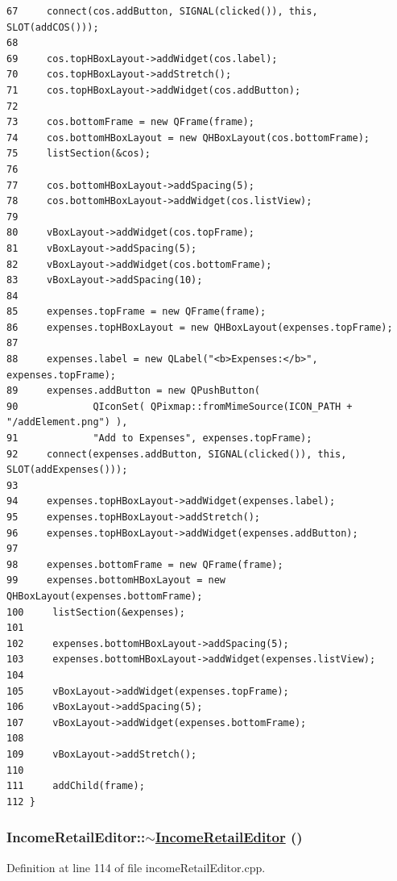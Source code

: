 \begin{verbatim}
67     connect(cos.addButton, SIGNAL(clicked()), this, SLOT(addCOS()));
68     
69     cos.topHBoxLayout->addWidget(cos.label);
70     cos.topHBoxLayout->addStretch();
71     cos.topHBoxLayout->addWidget(cos.addButton);
72     
73     cos.bottomFrame = new QFrame(frame);
74     cos.bottomHBoxLayout = new QHBoxLayout(cos.bottomFrame);
75     listSection(&cos);
76     
77     cos.bottomHBoxLayout->addSpacing(5);
78     cos.bottomHBoxLayout->addWidget(cos.listView);
79     
80     vBoxLayout->addWidget(cos.topFrame);
81     vBoxLayout->addSpacing(5);
82     vBoxLayout->addWidget(cos.bottomFrame);
83     vBoxLayout->addSpacing(10);
84    
85     expenses.topFrame = new QFrame(frame);
86     expenses.topHBoxLayout = new QHBoxLayout(expenses.topFrame);
87     
88     expenses.label = new QLabel("<b>Expenses:</b>", expenses.topFrame);
89     expenses.addButton = new QPushButton(
90             QIconSet( QPixmap::fromMimeSource(ICON_PATH + "/addElement.png") ),
91             "Add to Expenses", expenses.topFrame);
92     connect(expenses.addButton, SIGNAL(clicked()), this, SLOT(addExpenses()));
93     
94     expenses.topHBoxLayout->addWidget(expenses.label);
95     expenses.topHBoxLayout->addStretch();
96     expenses.topHBoxLayout->addWidget(expenses.addButton);
97     
98     expenses.bottomFrame = new QFrame(frame);
99     expenses.bottomHBoxLayout = new QHBoxLayout(expenses.bottomFrame);
100     listSection(&expenses);
101     
102     expenses.bottomHBoxLayout->addSpacing(5);
103     expenses.bottomHBoxLayout->addWidget(expenses.listView);
104     
105     vBoxLayout->addWidget(expenses.topFrame);
106     vBoxLayout->addSpacing(5);
107     vBoxLayout->addWidget(expenses.bottomFrame);
108     
109     vBoxLayout->addStretch();
110     
111     addChild(frame);
112 }
\end{verbatim}\normalsize 


\hypertarget{classIncomeRetailEditor_a1}{
\subsubsection[$\sim$IncomeRetailEditor]{\setlength{\rightskip}{0pt plus 5cm}Income\-Retail\-Editor::$\sim$\hyperlink{classIncomeRetailEditor}{Income\-Retail\-Editor} ()}}
\label{classIncomeRetailEditor_a1}


Definition at line 114 of file income\-Retail\-Editor.cpp.

